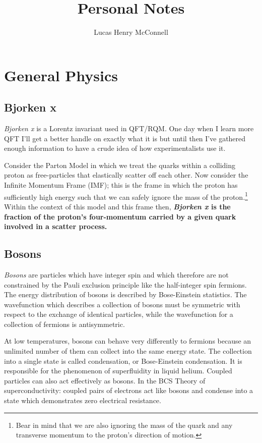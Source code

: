 \documentclass{article}
\begin{document}
\title{Personal Notes}
\author{Lucas Henry McConnell}

\maketitle
\tableofcontents

\section{General Physics}

\subsection{Bjorken x}
\emph{Bjorken x} is a Lorentz invariant used in QFT/RQM. One day when I learn more QFT I'll get a better handle on exactly what it is but until then I've gathered enough information to have a crude idea of how experimentalists use it.

Consider the Parton Model in which we treat the quarks within a colliding proton as free-particles that elastically scatter off each other. Now consider the Infinite Momentum Frame (IMF); this is the frame in which the proton has sufficiently high energy such that we can safely ignore the mass of the proton.\footnote{Bear in mind that we are also ignoring the mass of the quark and any transverse momentum to the proton's direction of motion.} Within the context of this model and this frame then, \textbf{\emph{Bjorken x} is the fraction of the proton's four-momentum carried by a given quark involved in a scatter process.}

\subsection{Bosons}
\emph{Bosons} are particles which have integer spin and which therefore are not constrained by the Pauli exclusion principle like the half-integer spin fermions. The energy distribution of bosons is described by Bose-Einstein statistics. The wavefunction which describes a collection of bosons must be symmetric with respect to the exchange of identical particles, while the wavefunction for a collection of fermions is antisymmetric.

At low temperatures, bosons can behave very differently to fermions because an unlimited number of them can collect into the same energy state. The collection into a single state is called condensation, or Bose-Einstein condensation. It is responsible for the phenomenon of superfluidity in liquid helium. Coupled particles can also act effectively as bosons. In the BCS Theory of superconductivity: coupled pairs of electrons act like bosons and condense into a state which demonstrates zero electrical resistance.
\end{document}

